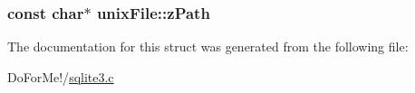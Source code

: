\hypertarget{structunix_file_afc5eff0948d553308cf90a79d4a06f17}{
\subsubsection[{z\-Path}]{\setlength{\rightskip}{0pt plus 5cm}const char$\ast$ unix\-File\-::z\-Path}}\label{structunix_file_afc5eff0948d553308cf90a79d4a06f17}


The documentation for this struct was generated from the following file\-:\begin{DoxyCompactItemize}
\item 
Do\-For\-Me!/\hyperlink{sqlite3_8c}{sqlite3.\-c}\end{DoxyCompactItemize}
